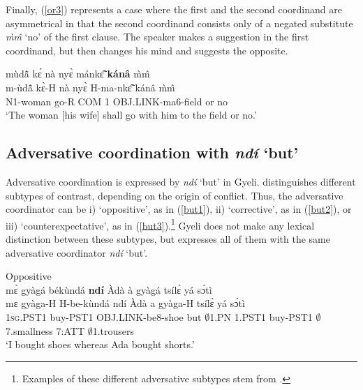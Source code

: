 Finally, (\ref{or3}) represents a case where the first and the second coordinand are asymmetrical in that the second coordinand consists only of a negated substitute {\itshape m̀m̂} `no' of the first clause. The speaker makes a suggestion in the first coordinand, but then changes his mind and suggests the opposite.

\begin{exe} 
\ex\label{or3}
  \glll mùdã̂ kɛ́ nà nyɛ̀ mánkɛ̃̂ {\bfseries kánâ} m̀m̂ \\
       m-ùdã̂ kɛ̀-H nà nyɛ̀ H-ma-nkɛ̃̂ kánâ m̀m̂ \\
         N1-woman go-R COM 1 OBJ.LINK-ma6-field or no  \\
    \trans `The woman [his wife] shall go with him to the field or no.'
\end{exe}





\subsection{Adversative coordination with {\itshape ndí} `but'}
\label{sec:AdverseCoord}

Adversative coordination is expressed by {\itshape ndí} `but' in Gyeli.
\citet{haspelmath2007} distinguishes different subtypes of contrast, depending on the origin of conflict. Thus, the adversative coordinator can be i) `oppositive', as in (\ref{but1}), ii) `corrective', as in (\ref{but2}), or iii) `counterexpectative', as in (\ref{but3}).\footnote{Examples of these different adversative subtypes stem from \citet{mauri2008}.} Gyeli does not make any lexical distinction between these subtypes, but expresses all of them with the same adversative coordinator {\itshape ndí} `but'.

\begin{exe}
\ex \label{but1} Oppositive\\
  \glll     mɛ̀ gyàgá békùndá {\bfseries ndí} Àdà à gyàgá tsílɛ̀ yá sɔ́tì \\
             mɛ gyàga-H H-be-kùndá ndí Àdà a gyàga-H tsílɛ̀ yá sɔ́tì \\
               1\textsc{sg}.PST1 buy-PST1 OBJ.LINK-be8-shoe but $\emptyset$1.PN 1.PST1 buy-PST1 $\emptyset$7.smallness 7:ATT $\emptyset$1.trousers \\
    \trans `I bought shoes whereas Ada bought shorts.'
\end{exe}

